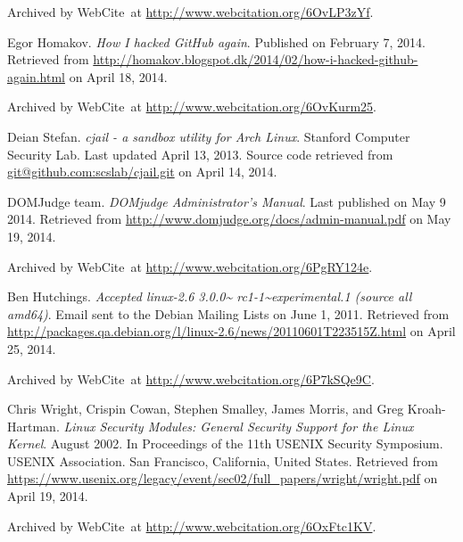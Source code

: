 \begin{thebibliography}{9}
Archived by WebCite\textsuperscript{\textregistered}\ at
\url{http://www.webcitation.org/6OvLP3zYf}.


Egor Homakov. \emph{How I hacked GitHub again}. Published on February 7, 2014.
Retrieved from
\url{http://homakov.blogspot.dk/2014/02/how-i-hacked-github-again.html} on
April 18, 2014.

Archived by WebCite\textsuperscript{\textregistered}\ at
\url{http://www.webcitation.org/6OvKurm25}.


Deian Stefan. \emph{cjail - a sandbox utility for Arch Linux}. Stanford
Computer Security Lab. Last updated April 13, 2013. Source code retrieved from
\url{git@github.com:scslab/cjail.git} on April 14, 2014.


DOMJudge team. \emph{DOMjudge Administrator's Manual}. Last published on May 9
2014. Retrieved from \url{http://www.domjudge.org/docs/admin-manual.pdf} on May
19, 2014.

Archived by WebCite\textsuperscript{\textregistered}\ at
\url{http://www.webcitation.org/6PgRY124e}.


Ben Hutchings. \emph{Accepted linux-2.6 3.0.0\textasciitilde
rc1-1\textasciitilde experimental.1 (source all amd64)}. Email sent to the
Debian Mailing Lists on June 1, 2011.  Retrieved from
\url{http://packages.qa.debian.org/l/linux-2.6/news/20110601T223515Z.html} on
April 25, 2014.

Archived by WebCite\textsuperscript{\textregistered}\ at
\url{http://www.webcitation.org/6P7kSQe9C}.


Chris Wright, Crispin Cowan, Stephen Smalley, James Morris, and Greg
Kroah-Hartman. \emph{Linux Security Modules: General Security Support for the
Linux Kernel}. August 2002. In Proceedings of the 11th USENIX Security
Symposium. USENIX Association. San Francisco, California, United States.
Retrieved from
\url{https://www.usenix.org/legacy/event/sec02/full_papers/wright/wright.pdf}
on April 19, 2014.

Archived by WebCite\textsuperscript{\textregistered}\ at
\url{http://www.webcitation.org/6OxFtc1KV}.



\end{thebibliography}
